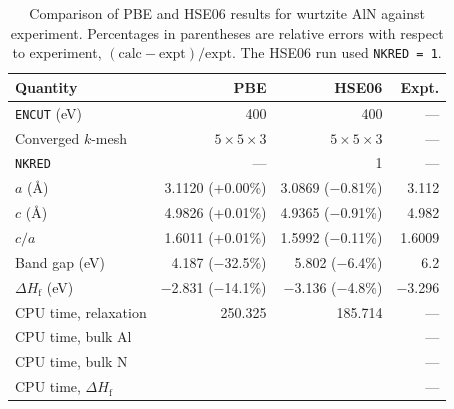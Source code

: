 \documentclass[../main.tex]{subfiles}
\begin{document}
\begin{table}[htbp]
  \centering
  \small %
  \caption{Comparison of PBE and HSE06 results for wurtzite AlN against experiment.
  Percentages in parentheses are relative errors with respect to experiment,
  $(\text{calc}-\text{expt})/\text{expt}$. The HSE06 run used \texttt{NKRED = 1}.}
  \label{tab:pbe_vs_hse06_aln}
  \begin{tabular}{l rrr}
    \toprule
    Quantity & PBE & HSE06 & Expt. \\
    \midrule
    \texttt{ENCUT} (eV)        & 400 & 400 & --- \\
    Converged $k$-mesh         & $5\times5\times3$ & $5\times5\times3$ & --- \\
    \texttt{NKRED}             & --- & 1 & --- \\
    \midrule
    $a$ (\AA)                  & 3.1120 (+0.00\%) & 3.0869 ($-$0.81\%) & 3.112 \\
    $c$ (\AA)                  & 4.9826 (+0.01\%) & 4.9365 ($-$0.91\%) & 4.982 \\
    $c/a$                      & 1.6011 (+0.01\%) & 1.5992 ($-$0.11\%) & 1.6009 \\
    Band gap (eV)              & 4.187 ($-$32.5\%) & 5.802 ($-$6.4\%)  & 6.2 \\
    $\Delta H_\mathrm{f}$ (eV) & $-$2.831 ($-$14.1\%) & $-$3.136 ($-$4.8\%) & $-$3.296 \\
    \midrule
    CPU time, relaxation       & 250.325 & 185.714 & --- \\
    CPU time, bulk Al          &  &  & --- \\ %
    CPU time, bulk N           &  &  & --- \\ %
    CPU time, $\Delta H_\mathrm{f}$ &  &  & --- \\ %
    \bottomrule
  \end{tabular}
\end{table}

    
\end{document}

